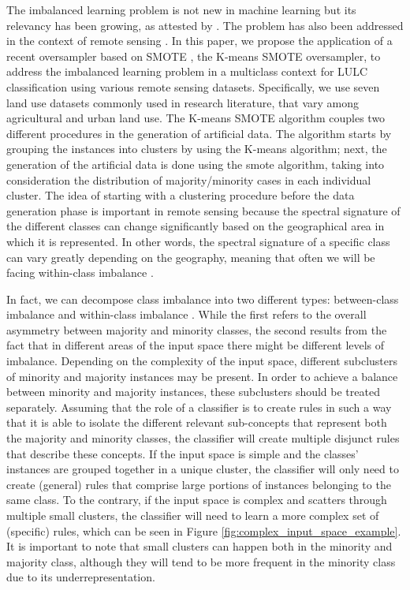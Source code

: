 \documentclass[preprint,12pt]{elsarticle}
\begin{document}
The imbalanced learning problem is not new in machine learning but its
relevancy has been growing, as attested by \cite{Haixiang2017}. The problem
has also been addressed in the context of remote sensing \cite{Douzas2019rs}.
In this paper, we propose the application of a recent oversampler based
on SMOTE \cite{Chawla2002}, the K-means SMOTE 
\cite{Douzas2018} oversampler, to address the imbalanced learning
problem in a multiclass context for LULC classification using various remote
sensing datasets. Specifically, we use seven land use datasets commonly
used in research literature, that vary among agricultural and urban land use.
The K-means SMOTE algorithm couples two different
procedures in the generation of artificial data. The algorithm starts by
grouping the instances into clusters by using the K-means
algorithm; next, the generation of the artificial
data is done using the smote algorithm, taking into consideration the distribution of
majority/minority cases in each individual cluster. The idea of starting with
a clustering procedure before the data generation phase is important in remote
sensing because the spectral signature of the different classes can change
significantly based on the geographical area in which it is represented. In
other words, the spectral signature of a specific class can vary greatly
depending on the geography, meaning that often we will be facing within-class
imbalance \cite{Japkowicz2001}.

In fact, we can decompose class imbalance into two different types:
between-class imbalance and within-class imbalance \cite{Douzas2018, Jo2004}.
While the first refers to the overall asymmetry between majority and minority
classes, the second results from the fact that in different areas of the input
space there might be different levels of imbalance. Depending on the
complexity of the input space, different subclusters of minority and majority
instances may be present. In order to achieve a balance between minority and
majority instances, these subclusters should be treated separately. Assuming
that the role of a classifier is to create rules in such a way that it is able
to isolate the different relevant sub-concepts that represent both the
majority and minority classes, the classifier will create multiple disjunct
rules that describe these concepts. If the input space is simple and the
classes’ instances are grouped together in a unique cluster, the classifier
will only need to create (general) rules that comprise large portions of
instances belonging to the same class. To the contrary, if the input space is
complex and scatters through multiple small clusters, the classifier will need
to learn a more complex set of (specific) rules, which can be seen in Figure
\ref{fig:complex_input_space_example}. It is important to note that small
clusters can happen both in the minority and majority class, although they
will tend to be more frequent in the minority class due to its
underrepresentation.  
\end{document}
